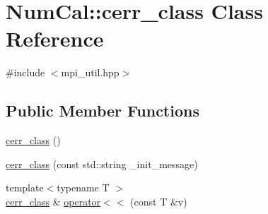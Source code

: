 \hypertarget{classNumCal_1_1cerr__class}{\section{Num\+Cal\+:\+:cerr\+\_\+class Class Reference}
\label{classNumCal_1_1cerr__class}
}


{\ttfamily \#include $<$mpi\+\_\+util.\+hpp$>$}

\subsection*{Public Member Functions}
\begin{DoxyCompactItemize}
\item 
\hyperlink{classNumCal_1_1cerr__class_a538478051819f923743aa5d4b39766c8}{cerr\+\_\+class} ()
\item 
\hyperlink{classNumCal_1_1cerr__class_a39412639b03b6616f2675567c676de40}{cerr\+\_\+class} (const std\+::string \+\_\+init\+\_\+message)
\item 
{\footnotesize template$<$typename T $>$ }\\\hyperlink{classNumCal_1_1cerr__class}{cerr\+\_\+class} \& \hyperlink{classNumCal_1_1cerr__class_a96b0fa887c120043ec684fe84065c7fb}{operator$<$$<$} (const T \&v)
\end{DoxyCompactItemize}


